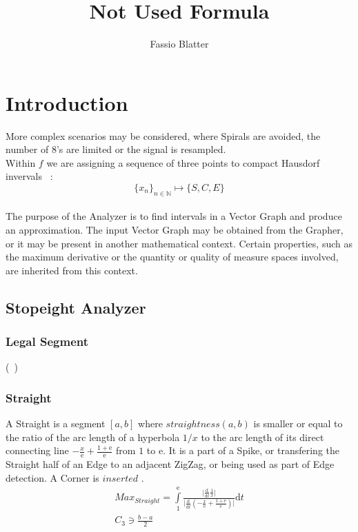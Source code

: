 \documentclass{report}
\begin{document}
\title{Not Used Formula}
\author{Fassio Blatter}
\maketitle

\chapter{Introduction}
More complex scenarios may be considered, where Spirals are avoided, the number of 8's are limited or the signal is resampled.\\
Within $f$ we are assigning a sequence of three points to compact Hausdorf invervals ~\cite[6.1.3.]{Mortad}:
\begin{equation}
\{x_{n}\}_{n \in \mathbb{N}} \mapsto \{S,C,E\}
\end{equation}\\

The purpose of the Analyzer is to find intervals in a Vector Graph and produce an approximation. The input Vector Graph may be obtained from the Grapher, or it may be present in another mathematical context. Certain properties, such as the maximum derivative or the quantity or quality of measure spaces involved, are inherited from this context.
\section{Stopeight Analyzer}

\subsection{Legal Segment}
(~\cite[Riemann Integrable?]{Widon})

\subsection{Straight}
A Straight is a segment $[a,b]$ where $straightness(a,b)$ is smaller or equal to the ratio of the arc length of a hyperbola $1/x$ to the arc length of its direct connecting line $-\frac{x}{\mathrm{e}}+\frac{1+\mathrm{e}}{\mathrm{e}}$ from $1$ to $\mathrm{e}$. It is a part of a Spike, or transfering the Straight half of an Edge to an adjacent ZigZag, or being used as part of Edge detection. A Corner is $inserted$ .
\begin{align}
Max_{Straight}=\int \limits _{1}^{\mathrm{e}}\frac{\lvert\frac{\mathrm{d}}{\mathrm{d}t}\frac{1}{x}\rvert}{\lvert\frac{\mathrm{d}}{\mathrm{d}t}(-\frac{x}{\mathrm{e}}+\frac{1+\mathrm{e}}{\mathrm{e}})\rvert}\mathrm{d}t\\
C_{3} \ni \frac{b-a}{2}
\end{align}
\end{document}
